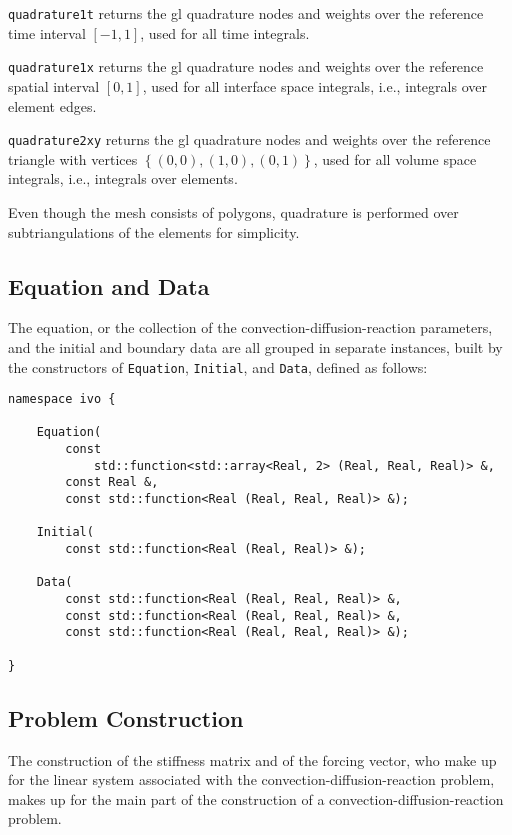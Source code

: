 \lstinline{quadrature1t} returns the \acrshort{gl} quadrature nodes and weights over the reference time interval $\left[ -1, 1 \right]$, used for all time integrals.

\lstinline{quadrature1x} returns the \acrshort{gl} quadrature nodes and weights over the reference spatial interval $\left[ 0, 1 \right]$, used for all interface space integrals, i.e., integrals over element edges.

\lstinline{quadrature2xy} returns the \acrshort{gl} quadrature nodes and weights over the reference triangle with vertices $\left\{ \left( 0, 0 \right), \left( 1, 0 \right), \left( 0, 1 \right) \right\}$, used for all volume space integrals, i.e., integrals over elements.

Even though the mesh consists of polygons, quadrature is performed over subtriangulations of the elements for simplicity.

\newpage
\subsection{Equation and Data}

The equation, or the collection of the convection-diffusion-reaction parameters, and the initial and boundary data are all grouped in separate instances, built by the constructors of \lstinline{Equation}, \lstinline{Initial}, and \lstinline{Data}, defined as follows:
\begin{lstlisting}[style=cpp]
namespace ivo {

    Equation(
        const 
            std::function<std::array<Real, 2> (Real, Real, Real)> &, 
        const Real &, 
        const std::function<Real (Real, Real, Real)> &);

    Initial(
        const std::function<Real (Real, Real)> &);

    Data(
        const std::function<Real (Real, Real, Real)> &, 
        const std::function<Real (Real, Real, Real)> &, 
        const std::function<Real (Real, Real, Real)> &);

}
\end{lstlisting}

\newpage
\subsection{Problem Construction}

The construction of the stiffness matrix and of the forcing vector, who make up for the linear system associated with the convection-diffusion-reaction problem, makes up for the main part of the construction of a convection-diffusion-reaction problem.

